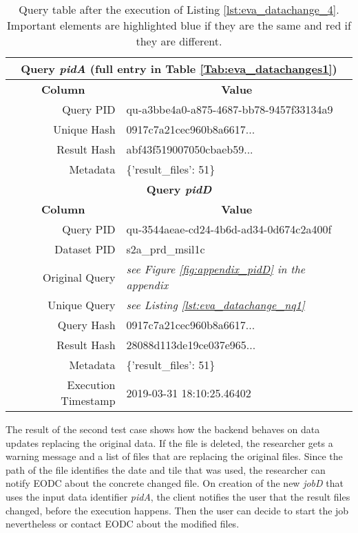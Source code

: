 \documentclass[draft,final]{vutinfth} %
\begin{document}
\begin{enumerate}
	\begin{table}[]
		\caption{Query table after the execution of Listing \ref{lst:eva_datachange_4}. Important elements are highlighted blue if they are the same and red if they are different.}
		\centering
		\begin{tabular}{|r|l|}
			\hline \multicolumn{2}{|c|}{\textbf{Query \textit{pidA} (full entry in Table \ref{Tab:eva_datachanges1})}} \\
			\hline \multicolumn{1}{|c|}{\textbf{Column}}  &  \multicolumn{1}{c|}{\textbf{Value}} \\ \hline
			Query PID & {\color{red}qu-a3bbe4a0-a875-4687-bb78-9457f33134a9}  \\ 
			Unique Hash & {\color{blue}0917c7a21cec960b8a6617...}  \\
			Result Hash & {\color{red}abf43f519007050cbaeb59...}   \\
			Metadata & \{'result\_files': 51\}  \\
			\hline \multicolumn{2}{|c|}{\textbf{Query \textit{pidD}}} \\
			\hline \multicolumn{1}{|c|}{\textbf{Column}}  &  \multicolumn{1}{c|}{\textbf{Value}} \\ \hline
			Query PID & { \color{red} qu-3544aeae-cd24-4b6d-ad34-0d674c2a400f}  \\ 
			Dataset PID & s2a\_prd\_msil1c  \\ 
			Original Query & \textit{see Figure \ref{fig:appendix_pidD} in the appendix} \\
			Unique Query & \textit{see Listing \ref{lst:eva_datachange_nq1}}  \\
			Query Hash & {\color{blue}0917c7a21cec960b8a6617...}  \\
			Result Hash & {\color{red}28088d113de19ce037e965...}  \\
			Metadata & \{'result\_files': 51\}  \\
			Execution Timestamp & 2019-03-31 18:10:25.46402   \\ \hline
		\end{tabular}
		\label{Tab:eva_datachanges5}
	\end{table}
\end{enumerate}
The result of the second test case shows how the backend behaves on data updates replacing the original data. If the file is deleted, the researcher gets a warning message and a list of files that are replacing the original files. Since the path of the file identifies the date and tile that was used, the researcher can notify EODC about the concrete changed file. On creation of the new \textit{jobD} that uses the input data identifier \textit{pidA}, the client notifies the user that the result files changed, before the execution happens. Then the user can decide to start the job nevertheless or contact EODC about the modified files.
\end{document}
